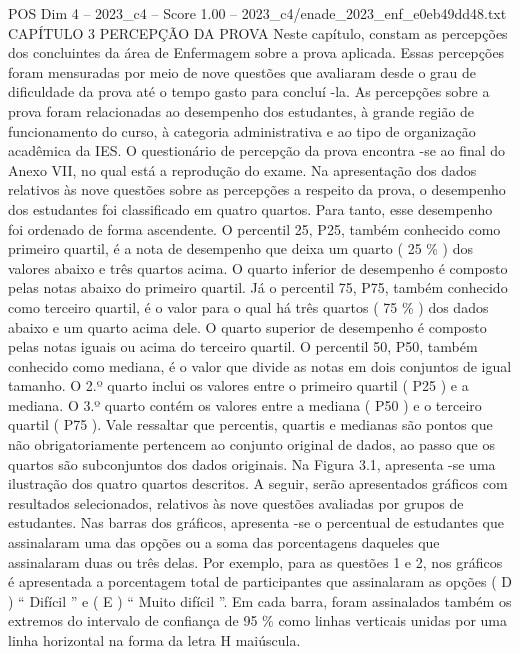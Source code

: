 \begin{textsample}{POS Dim 4 – 2023\_c4 – Score 1.00 – 2023\_c4/enade\_2023\_enf\_e0eb49dd48.txt}  \label{ex:f4_pos_174}
CAPÍTULO 3 PERCEPÇÃO DA PROVA Neste capítulo, constam as percepções dos concluintes da área de Enfermagem sobre a prova aplicada.
Essas percepções foram mensuradas por meio de nove questões que avaliaram desde o grau de dificuldade da prova até o tempo gasto para concluí -la.
As percepções sobre a prova foram relacionadas ao desempenho dos estudantes, à grande região de funcionamento do curso, à categoria administrativa e ao tipo de organização acadêmica da IES.
O questionário de percepção da prova encontra -se ao final do Anexo VII, no qual está a reprodução do exame.
Na apresentação dos dados relativos às nove questões sobre as percepções a respeito da prova, o desempenho dos estudantes foi classificado em quatro quartos.
Para tanto, esse desempenho foi ordenado de forma ascendente.
O percentil 25, P25, também conhecido como primeiro quartil, é a nota de desempenho que deixa um quarto ( 25 \% ) dos valores abaixo e três quartos acima.
O quarto inferior de desempenho é composto pelas notas abaixo do primeiro quartil.
Já o percentil 75, P75, também conhecido como terceiro quartil, é o valor para o qual há três quartos ( 75 \% ) dos dados abaixo e um quarto acima dele.
O quarto superior de desempenho é composto pelas notas iguais ou acima do terceiro quartil.
O percentil 50, P50, também conhecido como mediana, é o valor que divide as notas em dois conjuntos de igual tamanho.
O 2.º quarto inclui os valores entre o primeiro quartil ( P25 ) e a mediana.
O 3.º quarto contém os valores entre a mediana ( P50 ) e o terceiro quartil ( P75 ).
Vale ressaltar que percentis, quartis e medianas são pontos que não obrigatoriamente pertencem ao conjunto original de dados, ao passo que os quartos são subconjuntos dos dados originais.
Na Figura 3.1, apresenta -se uma ilustração dos quatro quartos descritos.
A seguir, serão apresentados gráficos com resultados selecionados, relativos às nove questões avaliadas por grupos de estudantes.
Nas barras dos gráficos, apresenta -se o percentual de estudantes que assinalaram uma das opções ou a soma das porcentagens daqueles que assinalaram duas ou três delas.
Por exemplo, para as questões 1 e 2, nos gráficos é apresentada a porcentagem total de participantes que assinalaram as opções ( D ) “ Difícil ” e ( E ) “ Muito difícil ”.
Em cada barra, foram assinalados também os extremos do intervalo de confiança de 95 \% como linhas verticais unidas por uma linha horizontal na forma da letra H maiúscula.

\end{textsample}
